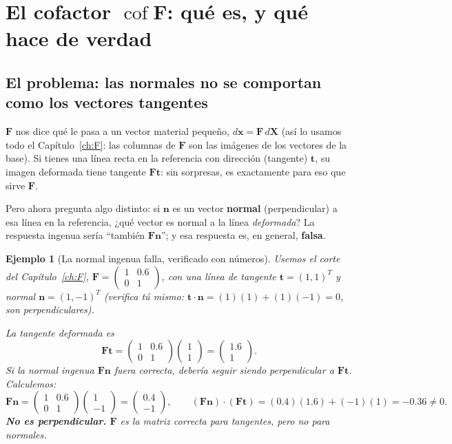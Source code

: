 \documentclass[11pt,a4paper]{article}
\newtheorem{ejemplo}{Ejemplo}
\newcommand{\Cof}{\operatorname{cof}}
\begin{document}
\section{El cofactor $\Cof\bm F$: qu\'e es, y qu\'e hace de verdad}
\label{ch:cofF}

\subsection{El problema: las normales no se comportan como los vectores tangentes}

$\bm F$ nos dice qu\'e le pasa a un vector material peque\~no,
$d\bm x=\bm F\,d\bm X$ (as\'i lo usamos todo el Cap\'itulo~\ref{ch:F}:
las columnas de $\bm F$ son las im\'agenes de los vectores de la
base). Si tienes una l\'inea recta en la referencia con direcci\'on
(tangente) $\bm t$, su imagen deformada tiene tangente $\bm F\bm t$:
sin sorpresas, es exactamente para eso que sirve $\bm F$.

Pero ahora pregunta algo distinto: si $\bm n$ es un vector
\textbf{normal} (perpendicular) a esa l\'inea en la referencia, ¿qu\'e
vector es normal a la l\'inea \emph{deformada}? La respuesta ingenua
ser\'ia ``tambi\'en $\bm F\bm n$''; y esa respuesta es, en general,
\textbf{falsa}.

\begin{ejemplo}[La normal ingenua falla, verificado con n\'umeros]
\label{ex:appB-cofF-normal}
Usemos el corte del Cap\'itulo~\ref{ch:F},
$\bm F=\begin{pmatrix}1&0.6\\0&1\end{pmatrix}$, con una l\'inea de
tangente $\bm t=(1,1)^T$ y normal $\bm n=(1,-1)^T$ (verifica t\'u mismo:
$\bm t\cdot\bm n=(1)(1)+(1)(-1)=0$, son perpendiculares).

La tangente deformada es
\[
 \bm F\bm t=\begin{pmatrix}1&0.6\\0&1\end{pmatrix}\begin{pmatrix}1\\1\end{pmatrix}
 =\begin{pmatrix}1.6\\1\end{pmatrix}.
\]
Si la normal ingenua $\bm F\bm n$ fuera correcta, deber\'ia seguir
siendo perpendicular a $\bm F\bm t$. Calculemos:
\[
 \bm F\bm n=\begin{pmatrix}1&0.6\\0&1\end{pmatrix}\begin{pmatrix}1\\-1\end{pmatrix}
 =\begin{pmatrix}0.4\\-1\end{pmatrix},
 \qquad
 (\bm F\bm n)\cdot(\bm F\bm t)=(0.4)(1.6)+(-1)(1)=-0.36\neq0.
\]
\textbf{No es perpendicular.} $\bm F$ es la matriz correcta para
tangentes, pero no para normales.
\end{ejemplo}
\end{document}
